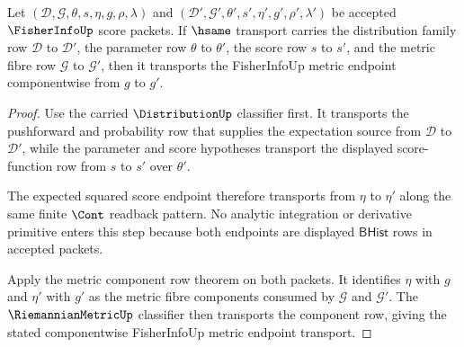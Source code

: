 \begin{theorem}
\label{thm:fisherinfo-classifier-transport-row}
Let $(\mathcal{D},\mathcal{G},\theta,s,\eta,g,\rho,\lambda)$ and
$(\mathcal{D}',\mathcal{G}',\theta',s',\eta',g',\rho',\lambda')$ be accepted
$\FisherInfoUp$ score packets. If $\hsame$ transport carries the distribution
family row $\mathcal{D}$ to $\mathcal{D}'$, the parameter row $\theta$ to
$\theta'$, the score row $s$ to $s'$, and the metric fibre row $\mathcal{G}$
to $\mathcal{G}'$, then it transports the FisherInfoUp metric endpoint
componentwise from $g$ to $g'$.
\end{theorem}
\begin{proof}
Use the carried $\DistributionUp$ classifier first. It transports the
pushforward and probability row that supplies the expectation source from
$\mathcal{D}$ to $\mathcal{D}'$, while the parameter and score hypotheses
transport the displayed score-function row from $s$ to $s'$ over
$\theta'$.

The expected squared score endpoint therefore transports from $\eta$ to
$\eta'$ along the same finite $\Cont$ readback pattern. No analytic
integration or derivative primitive enters this step because both endpoints
are displayed $\mathsf{BHist}$ rows in accepted packets.

Apply the metric component row theorem on both packets. It identifies $\eta$
with $g$ and $\eta'$ with $g'$ as the metric fibre components consumed by
$\mathcal{G}$ and $\mathcal{G}'$. The $\RiemannianMetricUp$ classifier then
transports the component row, giving the stated componentwise FisherInfoUp
metric endpoint transport.
\end{proof}

